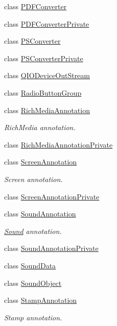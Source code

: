 \begin{DoxyCompactItemize}
class \hyperlink{class_poppler_1_1_p_d_f_converter}{P\+D\+F\+Converter}
\item 
class \hyperlink{class_poppler_1_1_p_d_f_converter_private}{P\+D\+F\+Converter\+Private}
\item 
class \hyperlink{class_poppler_1_1_p_s_converter}{P\+S\+Converter}
\item 
class \hyperlink{class_poppler_1_1_p_s_converter_private}{P\+S\+Converter\+Private}
\item 
class \hyperlink{class_poppler_1_1_q_i_o_device_out_stream}{Q\+I\+O\+Device\+Out\+Stream}
\item 
class \hyperlink{class_poppler_1_1_radio_button_group}{Radio\+Button\+Group}
\item 
class \hyperlink{class_poppler_1_1_rich_media_annotation}{Rich\+Media\+Annotation}
\begin{DoxyCompactList}\small\item\em Rich\+Media annotation. \end{DoxyCompactList}\item 
class \hyperlink{class_poppler_1_1_rich_media_annotation_private}{Rich\+Media\+Annotation\+Private}
\item 
class \hyperlink{class_poppler_1_1_screen_annotation}{Screen\+Annotation}
\begin{DoxyCompactList}\small\item\em Screen annotation. \end{DoxyCompactList}\item 
class \hyperlink{class_poppler_1_1_screen_annotation_private}{Screen\+Annotation\+Private}
\item 
class \hyperlink{class_poppler_1_1_sound_annotation}{Sound\+Annotation}
\begin{DoxyCompactList}\small\item\em \hyperlink{class_sound}{Sound} annotation. \end{DoxyCompactList}\item 
class \hyperlink{class_poppler_1_1_sound_annotation_private}{Sound\+Annotation\+Private}
\item 
class \hyperlink{class_poppler_1_1_sound_data}{Sound\+Data}
\item 
class \hyperlink{class_poppler_1_1_sound_object}{Sound\+Object}
\item 
class \hyperlink{class_poppler_1_1_stamp_annotation}{Stamp\+Annotation}
\begin{DoxyCompactList}\small\item\em Stamp annotation. \end{DoxyCompactList}\item 

\end{DoxyCompactItemize}
